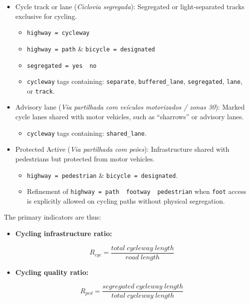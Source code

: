 \documentclass[
  authoryear,
  review,
  1p]{elsarticle}
\providecommand{\tightlist}{%
  \setlength{\itemsep}{0pt}\setlength{\parskip}{0pt}}
\begin{document}
\begin{itemize}
\item
  Cycle track or lane (\emph{Ciclovia segregada}): Segregated or
  light-separated tracks exclusive for cycling.

  \begin{itemize}
  \item
    \texttt{highway\ =\ cycleway}
  \item
    \texttt{highway\ =\ path} \& \texttt{bicycle\ =\ designated}
  \item
    \texttt{segregated\ =\ yes\ \textbar{}\ no}
  \item
    \texttt{cycleway} tags containing: \texttt{separate},
    \texttt{buffered\_lane}, \texttt{segregated}, \texttt{lane}, or
    \texttt{track}.
  \end{itemize}
\item
  Advisory lane (\emph{Via partilhada com veículos motorizados / zonas
  30}): Marked cycle lanes shared with motor vehicles, such as
  ``sharrows'' or advisory lanes.

  \begin{itemize}
  \tightlist
  \item
    \texttt{cycleway} tags containing: \texttt{shared\_lane}.
  \end{itemize}
\item
  Protected Active (\emph{Via partilhada com peões}): Infrastructure
  shared with pedestrians but protected from motor vehicles.

  \begin{itemize}
  \item
    \texttt{highway\ =\ pedestrian} \& \texttt{bicycle\ =\ designated}.
  \item
    Refinement of
    \texttt{highway\ =\ path\ \textbar{}\ footway\ \textbar{}\ pedestrian}
    when \texttt{foot} access is explicitly allowed on cycling paths
    without physical segregation.
  \end{itemize}
\end{itemize}

The primary indicators are thus:

\begin{itemize}
\item
  \textbf{Cycling infrastructure ratio:}

  \[R_{cyc}=\frac{total\; cycleway\; length}{road\; length}\]
\item
  \textbf{Cycling quality ratio:}

  \[R_{ped}=\frac{segregated\; cycleway\; length}{total\; cycleway\; length}\]
\end{itemize}
\end{document}
